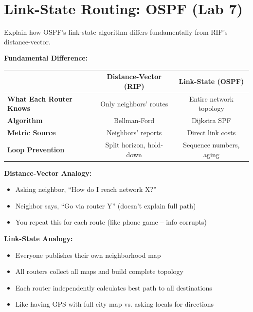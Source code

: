 \documentclass[12pt,a4paper]{article}
\begin{document}
\section{Link-State Routing: OSPF (Lab 7)}

\begin{qbox}{Explain how OSPF's link-state algorithm differs fundamentally from RIP's distance-vector.}
\end{qbox}

\begin{abox}
\textbf{Fundamental Difference:}

\begin{center}
\begin{tabular}{lcc}
\toprule
& \textbf{Distance-Vector (RIP)} & \textbf{Link-State (OSPF)} \\
\midrule
\textbf{What Each Router Knows} & Only neighbors' routes & Entire network topology \\
\textbf{Algorithm} & Bellman-Ford & Dijkstra SPF \\
\textbf{Metric Source} & Neighbors' reports & Direct link costs \\
\textbf{Loop Prevention} & Split horizon, hold-down & Sequence numbers, aging \\
\bottomrule
\end{tabular}
\end{center}

\textbf{Distance-Vector Analogy:}
\begin{itemize}
    \item Asking neighbor, ``How do I reach network X?''
    \item Neighbor says, ``Go via router Y'' (doesn't explain full path)
    \item You repeat this for each route (like phone game -- info corrupts)
\end{itemize}

\textbf{Link-State Analogy:}
\begin{itemize}
    \item Everyone publishes their own neighborhood map
    \item All routers collect all maps and build complete topology
    \item Each router independently calculates best path to all destinations
    \item Like having GPS with full city map vs. asking locals for directions
\end{itemize}


\end{abox}
\end{document}
